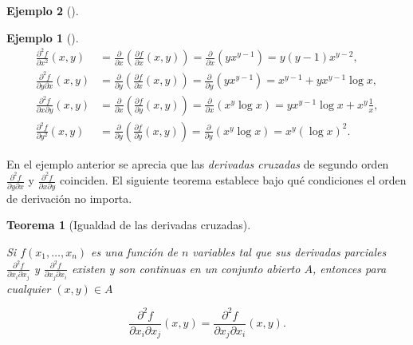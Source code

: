 \documentclass[
  a4paper,
]{scrreport}
\theoremstyle{definition}
\newtheorem{example}{Ejemplo}[chapter]
\theoremstyle{plain}
\theoremstyle{definition}
\theoremstyle{definition}
\theoremstyle{plain}
\newtheorem{theorem}{Teorema}[chapter]
\theoremstyle{plain}
\theoremstyle{remark}
\begin{document}
\begin{example}[]
\begin{example}[]
\[\begin{aligned}
\frac{\partial^2 f}{\partial x^2}(x,y) &=
\frac{\partial}{\partial x}\left(\frac{\partial f}{\partial x}(x,y)\right) =
\frac{\partial}{\partial x}\left(yx^{y-1}\right) =
y(y-1)x^{y-2},\\
\frac{\partial^2 f}{\partial y \partial x}(x,y) &=
\frac{\partial}{\partial y}\left(\frac{\partial f}{\partial x}(x,y)\right) =
\frac{\partial}{\partial y}\left(yx^{y-1}\right) =
x^{y-1}+yx^{y-1}\log x,\\
\frac{\partial^2 f}{\partial x \partial y}(x,y) &=
\frac{\partial}{\partial x}\left(\frac{\partial f}{\partial y}(x,y)\right) =
\frac{\partial}{\partial x}\left(x^y\log x \right) =
yx^{y-1}\log x+x^y\frac{1}{x},\\
\frac{\partial^2 f}{\partial y^2}(x,y) &=
\frac{\partial}{\partial y}\left(\frac{\partial f}{\partial y}(x,y)\right) =
\frac{\partial}{\partial y}\left(x^y\log x \right) =
x^y(\log x)^2.\end{aligned}\]

\end{example}

En el ejemplo anterior se aprecia que las \emph{derivadas cruzadas} de
segundo orden \(\frac{\partial^2 f}{\partial y\partial x}\) y
\(\frac{\partial^2 f}{\partial x\partial y}\) coinciden. El siguiente
teorema establece bajo qué condiciones el orden de derivación no
importa.

\begin{theorem}[Igualdad de las derivadas
cruzadas]\protect\hypertarget{thm-igualdad-derivadas-cruzadas}{}\label{thm-igualdad-derivadas-cruzadas}

Si \(f(x_1,\ldots,x_n)\) es una función de \(n\) variables tal que sus
derivadas parciales \(\frac{\partial^2 f}{\partial x_i\partial x_j}\) y
\(\frac{\partial^2 f}{\partial x_j\partial x_i}\) existen y son
continuas en un conjunto abierto \(A\), entonces para cualquier
\((x,y)\in A\)

\[
\frac{\partial^2 f}{\partial x_i\partial x_j}(x,y) 
= \frac{\partial^2 f}{\partial x_j\partial x_i}(x,y).
\]

\end{theorem}

\begin{tcolorbox}[enhanced jigsaw, leftrule=.75mm, colbacktitle=quarto-callout-note-color!10!white, toprule=.15mm, opacityback=0, opacitybacktitle=0.6, toptitle=1mm, breakable, bottomtitle=1mm, colframe=quarto-callout-note-color-frame, rightrule=.15mm, titlerule=0mm, title=\textcolor{quarto-callout-note-color}{\faInfo}\hspace{0.5em}{Demostración}, arc=.35mm, left=2mm, bottomrule=.15mm, colback=white, coltitle=black]


\end{tcolorbox}
\end{example}
\end{document}

